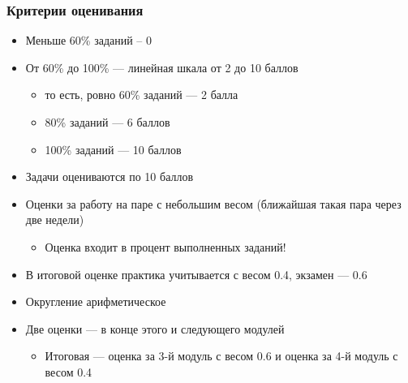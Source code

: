 \documentclass[xetex,mathserif,serif]{beamer}
\begin{document}
    \begin{frame}
        \frametitle{Критерии оценивания}
        \begin{itemize}
            \item Меньше 60\% заданий -- 0
            \item От 60\% до 100\% --- линейная шкала от 2 до 10 баллов
            \begin{itemize}
                \item то есть, ровно 60\% заданий --- 2 балла
                \item 80\% заданий --- 6 баллов
                \item 100\% заданий --- 10 баллов
            \end{itemize}
            \item Задачи оцениваются по 10 баллов
            \item Оценки за работу на паре с небольшим весом (ближайшая такая пара через две недели)
            \begin{itemize}
                \item Оценка входит в процент выполненных заданий!
            \end{itemize}
            \item В итоговой оценке практика учитывается с весом 0.4, экзамен --- 0.6
            \item Округление арифметическое
            \item Две оценки --- в конце этого и следующего модулей
            \begin{itemize}
                \item Итоговая --- оценка за 3-й модуль с весом 0.6 и оценка за 4-й модуль с весом 0.4
            \end{itemize}
        \end{itemize}
    \end{frame}
\end{document}

